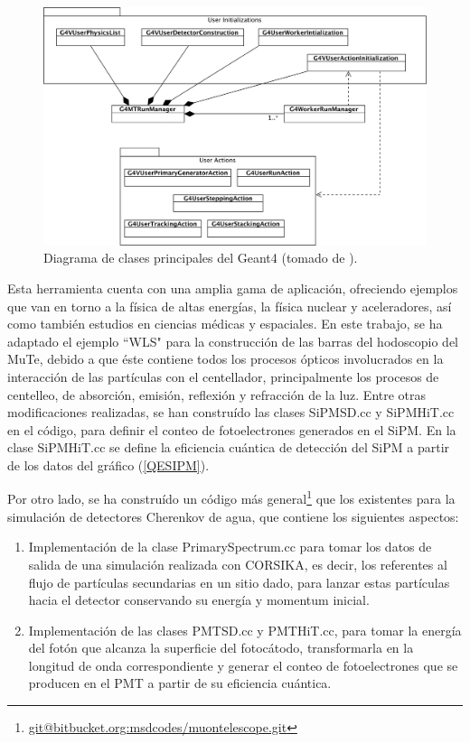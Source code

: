 \documentclass[12pt,oneside,openany,letter]{book}
\begin{document}
\begin{figure}[h]
\centering
\includegraphics[scale=1.4]{geant4.jpg}
\caption[Diagrama de clases principales del Geant4]{Diagrama de clases principales del Geant4 (tomado de \cite{ALLISON2016186}).
\label{geant4} }
\end{figure}

Esta herramienta cuenta con una amplia gama de aplicaci\'on, ofreciendo ejemplos que van en torno a la f\'isica de altas energías, la física nuclear y aceleradores, así como también estudios en ciencias médicas y espaciales. En este trabajo, se ha adaptado el ejemplo ``WLS" para la construcci\'on de las barras del hodoscopio del MuTe, debido a que \'este contiene todos los procesos \'opticos involucrados en la interacci\'on de las part\'iculas con el centellador, principalmente los procesos de centelleo, de absorci\'on, emisi\'on, reflexi\'on y refracci\'on de la luz. Entre otras modificaciones realizadas, se han constru\'ido las clases SiPMSD.cc y SiPMHiT.cc en el c\'odigo, para definir el conteo de fotoelectrones generados en el SiPM. En la clase SiPMHiT.cc se define la eficiencia cu\'antica de detecci\'on del SiPM a partir de los datos del gr\'afico (\ref{QESIPM}).     

Por otro lado, se ha constru\'ido un c\'odigo m\'as general\footnote{\url{git@bitbucket.org:msdcodes/muontelescope.git}} que los existentes para la simulaci\'on de detectores Cherenkov de agua, que contiene los siguientes aspectos:

\begin{enumerate}
\item Implementaci\'on de la clase PrimarySpectrum.cc para tomar los datos de salida de una simulaci\'on realizada con CORSIKA, es decir, los referentes al flujo de part\'iculas secundarias en un sitio dado, para lanzar estas part\'iculas hacia el detector conservando su energ\'ia y momentum inicial.

\item Implementaci\'on de las clases PMTSD.cc y PMTHiT.cc, para tomar la energ\'ia del fot\'on que alcanza la superficie del fotoc\'atodo, transformarla en la longitud de onda correspondiente y generar el conteo de fotoelectrones que se producen en el PMT a partir de su eficiencia cu\'antica.


\end{enumerate}



\end{document}
